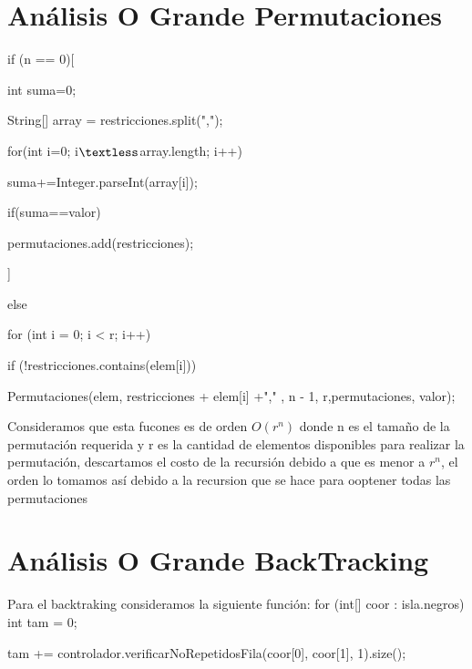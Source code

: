 \documentclass[conference]{IEEEtran}
\begin{document}
\section{Análisis O Grande Permutaciones}
\hspace{-70pt}if (n == 0)[

\hspace{-42pt}int suma=0;

\hspace{67pt}String[] array = restricciones.split(",");

\hspace {38pt}for(int i=0; i$\textless$array.length; i++)

\hspace{70pt}suma+=Integer.parseInt(array[i]);

\hspace{-50pt} if(suma==valor)

\hspace{40pt} permutaciones.add(restricciones); 

\hspace{-100pt}]

\hspace{-110pt}else 

\hspace{5pt}	for (int i = 0; i < r; i++) 

\hspace{70pt}	if (!restricciones.contains(elem[i])) 

\hspace{100pt}	Permutaciones(elem, restricciones + elem[i] +"," , n - 1, r,permutaciones, valor);

Consideramos que esta fucones es de orden $O(r^n)$ donde n es el tamaño de la permutación requerida y r es la cantidad de elementos disponibles para realizar la permutación, descartamos el costo de la recursión debido a que es menor a $r^n$, el orden lo tomamos así debido a la recursion que  se hace para ooptener todas las permutaciones

\section {Análisis O Grande BackTracking}
Para el backtraking consideramos la siguiente función:\newline
for (int[] coor : isla.negros) \textbraceleft
	\hspace{5pt}int tam = 0;
	
	\hspace{-40pt}tam += controlador.verificarNoRepetidosFila(coor[0], coor[1], 1).size();
	
\end{document}
